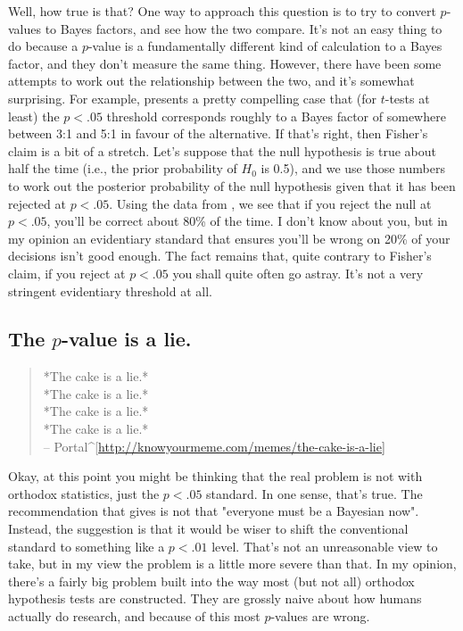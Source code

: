 Well, how true is that? One way to approach this question is to try to convert $p$-values to Bayes factors, and see how the two compare. It's not an easy thing to do because a $p$-value is a fundamentally different kind of calculation to a Bayes factor, and they don't measure the same thing. However, there have been some attempts to work out the relationship between the two, and it's somewhat surprising. For example,  presents a pretty compelling case that (for $t$-tests at least) the  $p<.05$ threshold corresponds roughly to a Bayes factor of somewhere between 3:1 and 5:1 in favour of the alternative. If that's right, then Fisher's claim is a bit of a stretch. Let's suppose that the null hypothesis is true about half the time (i.e., the prior probability of $H_0$ is 0.5), and we use those numbers to work out the posterior probability of the null hypothesis given that it has been rejected at $p<.05$. Using the data from , we see that if you reject the null at $p<.05$, you'll be correct about 80\% of the time. I don't know about you, but in my opinion an evidentiary standard that ensures you'll be wrong on 20\% of your decisions isn't good enough. The fact remains that, quite contrary to Fisher's claim, if you reject at $p<.05$ you shall quite often go astray. It's not a very stringent evidentiary threshold at all. 


\subsection{The $p$-value is a lie.}

\begin{quote}
*The cake is a lie.* \\ 
*The cake is a lie.* \\ 
*The cake is a lie.* \\ 
*The cake is a lie.* \\ 
\hspace*{1cm} -- Portal^[\url{http://knowyourmeme.com/memes/the-cake-is-a-lie]}
\end{quote}

Okay, at this point you might be thinking that the real problem is not with orthodox statistics, just the $p<.05$ standard. In one sense, that's true. The recommendation that  gives is not that "everyone must be a Bayesian now". Instead, the suggestion is that it would be wiser to shift the conventional standard to something like a $p<.01$ level. That's not an unreasonable view to take, but in my view the problem is a little more severe than that. In my opinion, there's a fairly big problem built into the way most (but not all) orthodox hypothesis tests are constructed. They are grossly naive about how humans actually do research, and because of this most $p$-values are wrong. 

